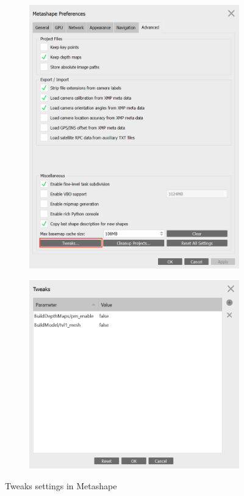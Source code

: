 \documentclass[10pt,letter,english]{article}
\begin{document}
\begin{figure}[H]
\centering
\begin{subfigure}{.45\textwidth}
  \centering
  \includegraphics[width=1\textwidth]{Figures/Metashape_tweaks_1.png}
  \caption{}
  \label{}
\end{subfigure}%
\hspace{0.5cm}
\begin{subfigure}{.45\textwidth}
  \centering
  \includegraphics[width=1\textwidth]{Figures/Metashape_tweaks_2.png}
  \caption{}
  \label{}
\end{subfigure}
\caption{Tweaks settings in Metashape}
\label{}
\end{figure}
\end{document}
